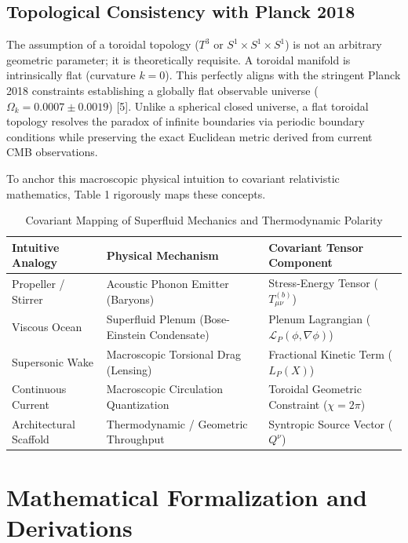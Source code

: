 \documentclass[aps,prd,onecolumn,linenumbers,superscriptaddress,nofootinbib]{revtex4-2}
\begin{document}
\subsection{Topological Consistency with Planck 2018}
The assumption of a toroidal topology ($T^3$ or $S^1 \times S^1 \times S^1$) is not an arbitrary geometric parameter; it is theoretically requisite. A toroidal manifold is intrinsically flat (curvature $k=0$). This perfectly aligns with the stringent Planck 2018 constraints establishing a globally flat observable universe ($\Omega_k = 0.0007 \pm 0.0019$) [5]. Unlike a spherical closed universe, a flat toroidal topology resolves the paradox of infinite boundaries via periodic boundary conditions while preserving the exact Euclidean metric derived from current CMB observations.

To anchor this macroscopic physical intuition to covariant relativistic mathematics, Table 1 rigorously maps these concepts.

\begin{table}[h]
\centering
\caption{Covariant Mapping of Superfluid Mechanics and Thermodynamic Polarity}
\begin{tabular}{lll}
\toprule
\textbf{Intuitive Analogy} & \textbf{Physical Mechanism} & \textbf{Covariant Tensor Component} \\
\midrule
Propeller / Stirrer & Acoustic Phonon Emitter (Baryons) & Stress-Energy Tensor ($T_{\mu\nu}^{(b)}$) \\
Viscous Ocean & Superfluid Plenum (Bose-Einstein Condensate) & Plenum Lagrangian ($\mathcal{L}_P(\phi,\nabla\phi)$) \\
Supersonic Wake & Macroscopic Torsional Drag (Lensing) & Fractional Kinetic Term ($L_P(X)$) \\
Continuous Current & Macroscopic Circulation Quantization & Toroidal Geometric Constraint ($\chi=2\pi$) \\
Architectural Scaffold & Thermodynamic / Geometric Throughput & Syntropic Source Vector ($Q^\nu$) \\
\bottomrule
\end{tabular}
\end{table}

\section{Mathematical Formalization and Derivations}
\end{document}
